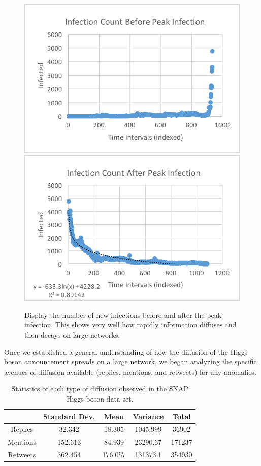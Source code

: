 \documentclass[12pt, oneside, openany]{article} %
\begin{document}
\begin{figure}
\centering
    \includegraphics{before.png}
      \includegraphics{after.png}
    \caption{Display the number of new infections before and after the peak infection. This shows very well how rapidly information diffuses and then decays on large networks.}
    \label{fig:before-after}
\end{figure}

Once we established a general understanding of how the diffusion of the Higgs boson announcement spreads on a large network, we began analyzing the specific avenues of diffusion available (replies, mentions, and retweets) for any anomalies.

\begin{table}
\centering
\begin{tabular}{| c || c | c | c | c |}
	\hline
   		& Standard Dev. & Mean & Variance &Total \\
   	\hline\hline
  	Replies & 32.342 & 18.305 & 1045.999 & 36902 \\
  	\hline
  	Mentions & 152.613 & 84.939 & 23290.67 & 171237 \\
  	\hline
  	Retweets & 362.454 & 176.057 & 131373.1 & 354930 \\
	\hline
\end{tabular}
  \caption{Statistics of each type of diffusion observed in the SNAP Higgs boson data set.}
  \label{tbl:type-stats}
\end{table}
\end{document}
